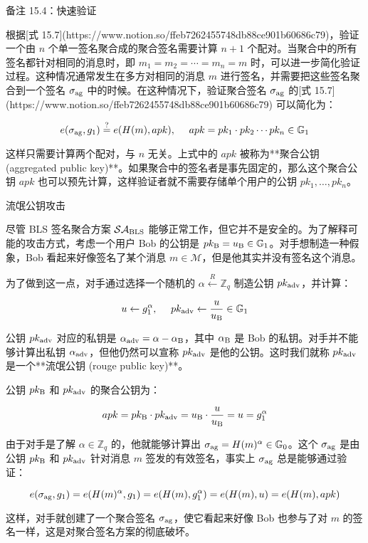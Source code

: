 备注 15.4：快速验证

根据[式 15.7](https://www.notion.so/ffeb7262455748db88ce901b60686c79)，验证一个由 $n$ 个单一签名聚合成的聚合签名需要计算 $n+1$ 个配对。当聚合中的所有签名都针对相同的消息时，即 $m_1=m_2=\cdots=m_n=m$ 时，可以进一步简化验证过程。这种情况通常发生在多方对相同的消息 $m$ 进行签名，并需要把这些签名聚合到一个签名 $\sigma_{\rm ag}$ 中的时候。在这种情况下，验证聚合签名 $\sigma_{\rm ag}$ 的[式 15.7](https://www.notion.so/ffeb7262455748db88ce901b60686c79) 可以简化为：

$$
e(\sigma_{\rm ag},g_1)\overset{?}=e(H(m),apk),
~~~~
apk=pk_1\cdot pk_2 \cdots pk_n \in \mathbb{G}_1
$$

这样只需要计算两个配对，与 $n$ 无关。上式中的 $apk$ 被称为**聚合公钥 (aggregated public key)**。如果聚合中的签名者是事先固定的，那么这个聚合公钥 $apk$ 也可以预先计算，这样验证者就不需要存储单个用户的公钥 $pk_1,\dots,pk_n$。

流氓公钥攻击

尽管 BLS 签名聚合方案 $\mathcal{SA}_{\rm BLS}$ 能够正常工作，但它并不是安全的。为了解释可能的攻击方式，考虑一个用户 Bob 的公钥是 $pk_{\rm B}=u_{\rm B}\in\mathbb{G}_1$。对手想制造一种假象，Bob 看起来好像签名了某个消息 $m\in \mathcal{M}$，但是他其实并没有签名这个消息。

为了做到这一点，对手通过选择一个随机的 $\alpha \overset{R}\leftarrow \mathbb{Z}_q$ 制造公钥 $pk_{\rm adv}$，并计算：

$$
u\leftarrow g_1^\alpha,
~~~~
pk_{\rm adv}\leftarrow \frac{u}{u_{\rm B}}\in\mathbb{G}_1
$$

公钥 $pk_{\rm adv}$ 对应的私钥是 $\alpha_{\rm adv}=\alpha-\alpha_{\rm B}$，其中 $\alpha_{\rm B}$ 是 Bob 的私钥。对手并不能够计算出私钥 $\alpha_{\rm adv}$，但他仍然可以宣称 $pk_{\rm adv}$ 是他的公钥。这时我们就称 $pk_{\rm adv}$ 是一个**流氓公钥 (rouge public key)**。

公钥 $pk_{\rm B}$ 和 $pk_{\rm adv}$ 的聚合公钥为：

$$
apk=pk_{\rm B}\cdot pk_{\rm adv} = u_{\rm B}\cdot\frac{u}{u_{\rm B}} = u = g_1^\alpha
$$

由于对手是了解 $\alpha \in \mathbb{Z}_q$ 的，他就能够计算出 $\sigma_{\rm ag}=H(m)^\alpha \in \mathbb{G}_0$。这个 $\sigma_{\rm ag}$ 是由公钥 $pk_{\rm B}$ 和 $pk_{\rm adv}$ 针对消息 $m$ 签发的有效签名，事实上 $\sigma_{\rm ag}$ 总是能够通过验证：

$$
e(\sigma_{\rm ag},g_1)=e(H(m)^\alpha,g_1)=e(H(m),g_1^\alpha)=e(H(m),u)=e(H(m),apk)
$$

这样，对手就创建了一个聚合签名 $\sigma_{\rm ag}$，使它看起来好像 Bob 也参与了对 $m$ 的签名一样，这是对聚合签名方案的彻底破坏。

